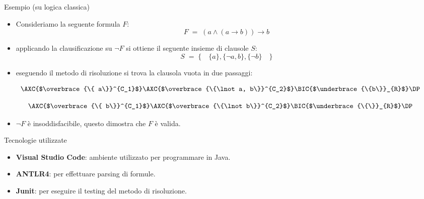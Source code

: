 \documentclass{beamer}
\begin{document}
\begin{frame}{Esempio (su logica classica)}
    \begin{itemize}
        \item Consideriamo la seguente formula $F$:
        \[
            F \; = \; (a \land (a \to b)) \to b
        \]
        \item applicando la clausificazione su $\lnot F$ si ottiene il seguente insieme di clausole $S$:
        \[
            S \; = \; \{\quad \{a\}, \{\lnot a, b\}, \{\lnot b\} \quad\}
        \]
        \item eseguendo il metodo di risoluzione si trova la clausola vuota in due passaggi:
        
    \end{itemize}
    \begin{center}
        \begin{minipage}{0.45\textwidth}
            \[
                \AXC{$\overbrace{\{ a\}}^{C_1}$}
                \AXC{$\overbrace{\{\lnot a, b\}}^{C_2}$}
                \RightLabel{Res}
                \BIC{$\underbrace{\{b\}}_{R}$}
                \DP
            \]
        \end{minipage}
        \hspace{0.05\textwidth}
        \begin{minipage}{0.45\textwidth}
            \[
                \AXC{$\overbrace{\{ b\}}^{C_1}$}
                \AXC{$\overbrace{\{\lnot b\}}^{C_2}$}
                \RightLabel{Res}
                \BIC{$\underbrace{\{\}}_{R}$}
                \DP
            \]
        \end{minipage}
    \end{center}

    \begin{itemize}
        \item $\lnot F$ è insoddisfacibile, questo dimostra che $F$ è valida.
    \end{itemize}
    
\end{frame}

\begin{frame}{Tecnologie utilizzate}
    \begin{itemize}
        \item \textbf{Visual Studio Code}: ambiente utilizzato per programmare in Java.
        \vspace{10px}
        \item \textbf{ANTLR4}: per effettuare parsing di formule.
        \vspace{10px}
        \item \textbf{Junit}: per eseguire il testing del metodo di risoluzione.
    \end{itemize}
\end{frame}


\backmatter
\end{document}
